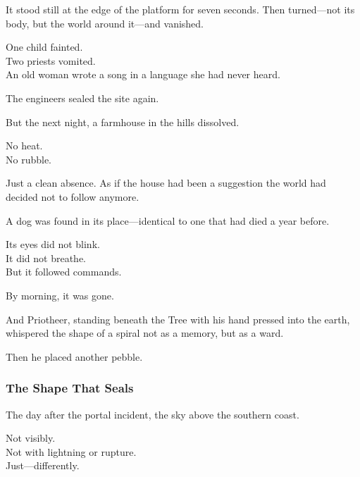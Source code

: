\documentclass[12pt]{article}
\begin{document}
\vspace{0.5em}
It stood still at the edge of the platform for seven seconds. Then turned---not its body, but the world around it---and vanished.

\vspace{0.5em}
One child fainted.\\
Two priests vomited.\\
An old woman wrote a song in a language she had never heard.

\vspace{0.5em}
The engineers sealed the site again.

\vspace{0.5em}
But the next night, a farmhouse in the hills dissolved.

\vspace{0.5em}
No heat.\\
No rubble.

\vspace{0.5em}
Just a clean absence. As if the house had been a suggestion the world had decided not to follow anymore.

\vspace{0.5em}
A dog was found in its place---identical to one that had died a year before.

\vspace{0.5em}
Its eyes did not blink.\\
It did not breathe.\\
But it followed commands.

\vspace{0.5em}
By morning, it was gone.

\vspace{0.5em}
And Priotheer, standing beneath the Tree with his hand pressed into the earth, whispered the shape of a spiral not as a memory, but as a ward.

\vspace{0.5em}
Then he placed another pebble.

\dotfill

\subsubsection{The Shape That Seals}

The day after the portal incident, the sky above the southern coast.

\vspace{0.5em}
Not visibly.\\
Not with lightning or rupture.\\
Just---differently.
\end{document}
